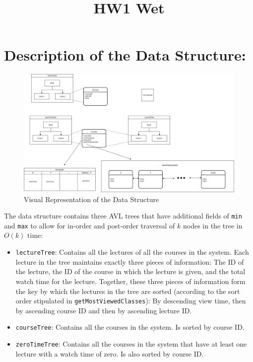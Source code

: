 \documentclass{article}
\title{HW1 Wet}
\date{}
\newcommand{\code}[1]{\texttt{#1}}
\begin{document}
\maketitle
\section*{Description of the Data Structure:}
    \begin{figure}[h]
    \caption{Visual Representation of the Data Structure}
    \centering
    \includegraphics[width=\textwidth]{ds_layout}
    \end{figure}
    The data structure contains three AVL trees that have additional fields of \texttt{min} and \texttt{max}
    to allow for in-order and post-order traversal of $k$ nodes in the tree in $O(k)$ time:
    \begin{itemize}
        \item \code{lectureTree}: Contains all the lectures of all the courses in the system. Each lecture in 
                the tree maintains exactly three pieces of information: The ID of the lecture, the ID of the 
                course in which the lecture is given, and the total watch time for the lecture. 
                Together, these three pieces of information form the key by which the lectures in the tree are sorted 
                (according to the sort order stipulated in \code{getMostViewedClasses}): By descending view time,
                then by ascending course ID and then by ascending lecture ID.
        \item \code{courseTree}: Contains all the courses in the system. Is sorted by course ID. 
        \item \code{zeroTimeTree}: Contains all the courses in the system that have at least one lecture 
                with a watch time of zero. Is also sorted by course ID. 

    \end{itemize}
\end{document}
